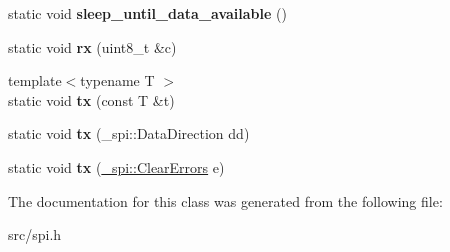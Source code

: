 \begin{DoxyCompactItemize}
static void {\bfseries sleep\+\_\+until\+\_\+data\+\_\+available} ()
\item 
\hypertarget{classSpiMaster_a531c31eeecb93de2deae102c3a89e46e}{}\label{classSpiMaster_a531c31eeecb93de2deae102c3a89e46e} 
static void {\bfseries rx} (uint8\+\_\+t \&c)
\item 
\hypertarget{classSpiMaster_ad4971c2ca4c7e3eb26c938f807f3daa2}{}\label{classSpiMaster_ad4971c2ca4c7e3eb26c938f807f3daa2} 
{\footnotesize template$<$typename T $>$ }\\static void {\bfseries tx} (const T \&t)
\item 
\hypertarget{classSpiMaster_aadf80e091329354903f5eef086efaf32}{}\label{classSpiMaster_aadf80e091329354903f5eef086efaf32} 
static void {\bfseries tx} (\+\_\+spi\+::\+Data\+Direction dd)
\item 
\hypertarget{classSpiMaster_a5bf811b0e51d0dcbbf53a19850bb58fb}{}\label{classSpiMaster_a5bf811b0e51d0dcbbf53a19850bb58fb} 
static void {\bfseries tx} (\hyperlink{class__transmission_1_1ClearErrors}{\+\_\+spi\+::\+Clear\+Errors} e)
\end{DoxyCompactItemize}


The documentation for this class was generated from the following file\+:\begin{DoxyCompactItemize}
\item 
src/spi.\+h\end{DoxyCompactItemize}
